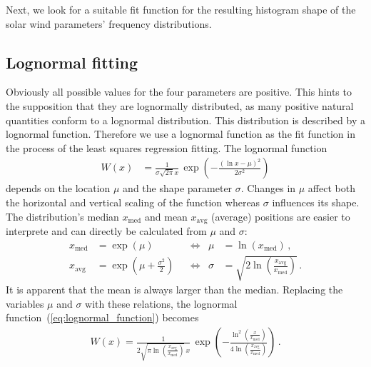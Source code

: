 Next, we look for a suitable fit function for the resulting histogram shape of the solar wind parameters' frequency distributions.

\subsection{Lognormal fitting}
Obviously all possible values for the four parameters are positive. This hints to the supposition that they are lognormally distributed, as many positive natural quantities conform to a lognormal distribution. This distribution is described by a lognormal function.
Therefore we use a lognormal function as the fit function in the process of the least squares regression fitting.
The lognormal function
\begin{align}
	W(x) &= \frac{1}{\sigma \sqrt{2 \pi} x} \, \exp\left(- \frac{\left(\ln x - \mu\right)^2}{2 \sigma^2}\right)	\label{eq:lognormal_function}
\end{align}
depends on the location $\mu$ and the shape parameter $\sigma$. Changes in $\mu$ affect both the horizontal and vertical scaling of the function whereas $\sigma$ influences its shape. The distribution's median $x_\text{med}$ and mean $x_\text{avg}$ (average) positions are easier to interprete and can directly be calculated from $\mu$ and $\sigma$:
\begin{align}
	x_\text{med} &= \exp\left(\mu\right)	&	&\Longleftrightarrow	&	\mu &= \ln\left(x_\text{med}\right)\,,	\label{eq:lognormal_median}\\
	x_\text{avg} &= \exp\left(\mu + \frac{\sigma^2}{2}\right)	&	&\Longleftrightarrow	&	\sigma &= \sqrt{2 \ln\left(\frac{x_\text{avg}}{x_\text{med}}\right)}\,.	\label{eq:lognormal_mean}
\end{align}
It is apparent that the mean is always larger than the median. Replacing the variables $\mu$ and $\sigma$ with these relations, the lognormal function~(\ref{eq:lognormal_function}) becomes
\begin{align}
	W(x) = \frac{1}{2 \sqrt{\pi \ln\left(\frac{x_\text{avg}}{x_\text{med}}\right)} \, x} \, \exp\left(- \frac{\ln^2\left(\frac{x}{x_\text{med}}\right)}{4 \ln\left(\frac{x_\text{avg}}{x_\text{med}}\right)}\right)\,.	\label{eq:single_lognormal_fit_function}
\end{align}
